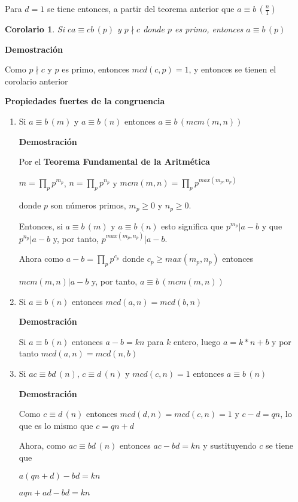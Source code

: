 \documentclass[a4paper,12pt]{report}
\newtheorem*{cor}{Corolario}
\begin{document}
Para $d=1$ se tiene entonces, a partir del teorema anterior que $a\equiv b \, (\frac{n}{1})$

\begin{cor}
 Si $ca \equiv cb \, (p)$ y $p\nmid c$ donde $p$ es primo, entonces $a \equiv b \, (p)$
\end{cor}

\textbf{Demostración}

Como $p\nmid c$ y $p$ es primo, entonces $mcd(c,p)=1$, y entonces se tienen el corolario anterior


\textbf{Propiedades fuertes de la congruencia}
\begin{enumerate}
 \item Si $a \equiv b \, (m)$ y $a \equiv b \, (n)$ entonces $a \equiv b \, (mcm(m,n))$
 
 \textbf{Demostración}
 
 Por el \textbf{Teorema Fundamental de la Aritmética} 
 
 $m=\prod_pp^{m_p}$, $n=\prod_pp^{n_p}$ y $mcm(m,n)=\prod_pp^{max(m_p,n_p)}$
 
 donde $p$ son números primos, $m_p\geq 0$ y $n_p\geq 0$.
 
 Entonces, si $a \equiv b \, (m)$ y $a \equiv b \, (n)$ esto significa que $p^{m_p}|a-b$ y que $p^{n_p}|a-b$ y, por tanto, $p^{max(m_p,n_p)}|a-b$.
 
 Ahora como $a-b=\prod_pp^{c_p}$ donde $c_p\geq max(m_p,n_p)$ entonces 
 
 $mcm(m,n)|a-b$ y, por tanto, 
 $a\equiv b \, (mcm(m,n))$
 
 \item Si $a \equiv b \, (n)$ entonces $mcd(a,n)=mcd(b,n)$
 
  \textbf{Demostración}
  
  Si $a \equiv b \, (n)$ entonces $a-b=kn$ para $k$ entero, luego $a=k*n+b$ y por tanto $mcd(a,n)=mcd(n,b)$
 
 \item Si $ac \equiv bd \, (n)$, $c \equiv d \, (n)$ y $mcd(c,n)=1$ entonces $a \equiv b \, (n)$
 
 \textbf{Demostración}
 
 Como $c \equiv d \, (n)$ entonces $mcd(d,n)=mcd(c,n)=1$ y  $c-d=qn$, lo que es lo mismo que $c=qn+d$
 
 Ahora, como $ac \equiv bd \, (n)$ entonces $ac-bd=kn$ y sustituyendo $c$ se tiene que 
 
 $a(qn+d)-bd=kn$
 
 $aqn+ad-bd=kn$
 

\end{enumerate}
\end{document}
